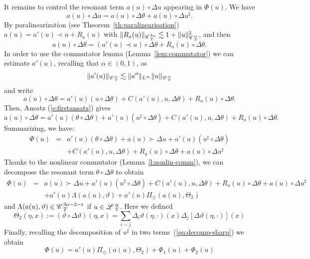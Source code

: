 \documentclass[11pt,reqno]{amsart}
\newcommand{\assign}{:=}
\newcommand{\cdummy}{\cdot}
\newcommand{\CC}{\mathscr{C} \hspace{.1em}}
\newcommand{\LL}{\mathscr{L} \hspace{.2em}}
\begin{document}
It remains to control the resonant term $a (u) \circ \Delta u$ appearing in
$\Phi (u)$. We have
\[ a (u) \circ \Delta u = a (u) \circ \Delta \theta + a (u) \circ \Delta
   u^{\sharp} . \]
By paralinearization (see Theorem~\ref{th:paralinearisation}) $a (u) = a' (u)
\prec u + R_a (u)$ with $\| R_a (u) \|_{\CC^{2 \alpha}_T} \lesssim 1 + \| u
\|^2_{\CC^{\alpha}_T}$, and then
\[ a (u) \circ \Delta \theta = (a' (u) \prec u) \circ \Delta \theta + R_a (u)
   \circ \Delta \theta . \]
In order to use the commutator lemma (Lemma~\ref{lem:commutator}) we can
estimate $a' (u)$, recalling that $\alpha \in (0, 1)$, as
\[ \| a' (u) \|_{\CC^{\alpha}_T} \lesssim \| a'' \|_{L^{\infty}} \| u
   \|_{\CC^{\alpha}_T} \]
and write
\[ a (u) \circ \Delta \theta = a' (u) (u \circ \Delta \theta) + C (a' (u), u,
   \Delta \theta) + R_a (u) \circ \Delta \theta . \]
Then, Ansatz (\ref{e:firstansatz}) gives
\[ a (u) \circ \Delta \theta = a' (u) (\theta \circ \Delta \theta) + a' (u)
   (u^{\sharp} \circ \Delta \theta) + C (a' (u), u, \Delta \theta) + R_a (u)
   \circ \Delta \theta . \]
Summarizing, we have:
\begin{eqnarray*}
  \Phi (u) & = & a' (u) (\theta \circ \Delta \theta) + a (u) \succ \Delta u +
  a' (u) (u^{\sharp} \circ \Delta \theta)\\
  &  & + C (a' (u), u, \Delta \theta) + R_a (u) \circ \Delta \theta + a (u)
  \circ \Delta u^{\sharp}
\end{eqnarray*}
Thanks to the nonlinear commutator (Lemma~\ref{l:nonlin-comm}), we can
decompose the resonant term $\theta \circ \Delta \theta$ to obtain
\begin{eqnarray*}
  \Phi (u) & = & a (u) \succ \Delta u + a' (u) (u^{\sharp} \circ \Delta
  \theta) + C (a' (u), u, \Delta \theta) + R_a (u) \circ \Delta \theta + a (u)
  \circ \Delta u^{\sharp}\\
  &  & + a' (u) \Lambda (a (u), \vartheta) + a' (u) \Pi_{\diamondsuit} (a
  (u), \Theta_2)
\end{eqnarray*}
and $\Lambda (a (u), \vartheta) \in \CC^{3 \alpha - 2 - \varepsilon}_T$ if $u
\in \LL^{\alpha}_T$. Here we defined
\begin{equation}
  \Theta_2 (\eta, x) \assign (\vartheta \circ \Delta \vartheta) (\eta, x) =
  \sum_{i \sim j} \Delta_i \vartheta (\eta, \cdummy) (x) \Delta_j [\Delta
  \vartheta (\eta, \cdummy)] (x) \label{e:def-Theta}
\end{equation}
Finally, recalling the decomposition of $u^{\sharp}$ in two
terms~(\ref{eq:decomp-sharp}) we obtain
\[ \Phi (u) = a' (u) \Pi_{\diamondsuit} (a (u), \Theta_2) + \Phi_1 (u) +
   \Phi_2 (u) \]
\end{document}

